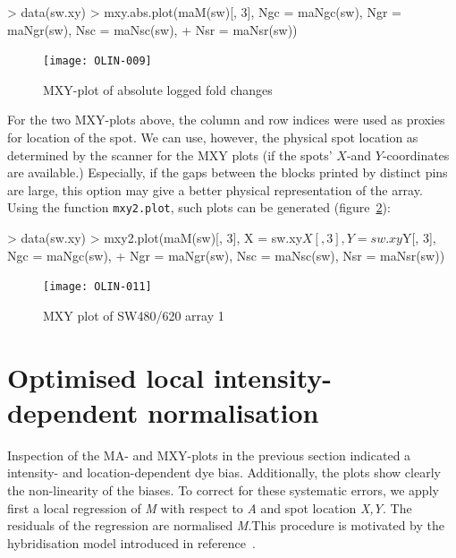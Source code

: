 \documentclass[a4paper,11pt]{article}
\begin{document}
\begin{Schunk}
\begin{Sinput}
> data(sw.xy)
> mxy.abs.plot(maM(sw)[, 3], Ngc = maNgc(sw), Ngr = maNgr(sw), Nsc = maNsc(sw),
+  Nsr = maNsr(sw))
\end{Sinput}
\end{Schunk}

\begin{figure}
\centering

\texttt{[image: OLIN-009]}
\caption{MXY-plot of absolute logged fold changes}
\label{mxyabsplot}
\end{figure}


For the two MXY-plots above, the column and row indices were used as proxies for location 
of the spot. We can use, however, the physical spot location as determined by the 
scanner for the MXY plots (if the spots' $X$-and $Y$-coordinates are available.) 
Especially, if the gaps between the blocks printed by distinct pins are large,
this option may give a better physical representation of the array.
Using the function \texttt{mxy2.plot}, such plots can be generated (figure~\ref{mxy2plot}): 

\begin{Schunk}
\begin{Sinput}
> data(sw.xy)
> mxy2.plot(maM(sw)[, 3], X = sw.xy$X[, 3], Y = sw.xy$Y[, 3], Ngc = maNgc(sw), 
+ Ngr = maNgr(sw), Nsc = maNsc(sw), Nsr = maNsr(sw))
\end{Sinput}
\end{Schunk}

\begin{figure}
\centering
\texttt{[image: OLIN-011]}
\caption{MXY plot of SW480/620 array 1}
\label{mxy2plot}
\end{figure}


\section{Optimised local intensity-dependent normalisation}
Inspection of the MA- and MXY-plots in the previous section indicated a intensity- and location-dependent dye 
bias. Additionally, the plots show clearly the non-linearity of the biases. To correct for these systematic errors,
 we apply first a local regression of \emph{M} with respect to \emph{A} and spot location \emph{X,Y}.
The residuals of the regression are normalised \emph{M}.This procedure is motivated by the hybridisation model introduced in reference~\cite{toni}.
\end{document}
